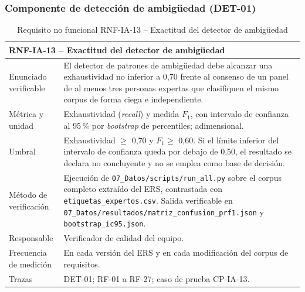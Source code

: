 \documentclass[11pt,a4paper]{article}
\begin{document}
\newcommand{\rnfia}[9]{%
\begin{longtable}{|p{3.2cm}|p{10.6cm}|}
\caption[#1: #2]{Requisito no funcional #1 -- #2}\\
\hline
\multicolumn{2}{|l|}{\textbf{#1 -- #2}} \\
\hline
Enunciado verificable & #3 \\
\hline
Métrica y unidad & #4 \\
\hline
Umbral & #5 \\
\hline
Método de verificación & #6 \\
\hline
Responsable & #7 \\
\hline
Frecuencia de medición & #8 \\
\hline
Trazas & #9 \\
\hline
\end{longtable}
\vspace{-0.4cm}
}

\subsubsection{Componente de detección de ambigüedad (DET-01)}

\rnfia{RNF-IA-13}{Exactitud del detector de ambigüedad}
{El detector de patrones de ambigüedad debe alcanzar una exhaustividad no
inferior a 0,70 frente al consenso de un panel de al menos tres personas
expertas que clasifiquen el mismo corpus de forma ciega e independiente.}
{Exhaustividad (\textit{recall}) y medida $F_1$, con intervalo de confianza al
95\,\% por \textit{bootstrap} de percentiles; adimensional.}
{Exhaustividad $\geq$ 0,70 y $F_1 \geq$ 0,60. Si el límite inferior del
intervalo de confianza queda por debajo de 0,50, el resultado se declara no
concluyente y no se emplea como base de decisión.}
{Ejecución de \texttt{07\_Datos/scripts/run\_all.py} sobre el corpus completo
extraído del ERS, contrastada con \texttt{etiquetas\_expertos.csv}. Salida
verificable en \texttt{07\_Datos/resultados/matriz\_confusion\_prf1.json} y
\texttt{bootstrap\_ic95.json}.}
{Verificador de calidad del equipo.}
{En cada versión del ERS y en cada modificación del corpus de requisitos.}
{DET-01; RF-01 a RF-27; caso de prueba CP-IA-13.}
\end{document}
